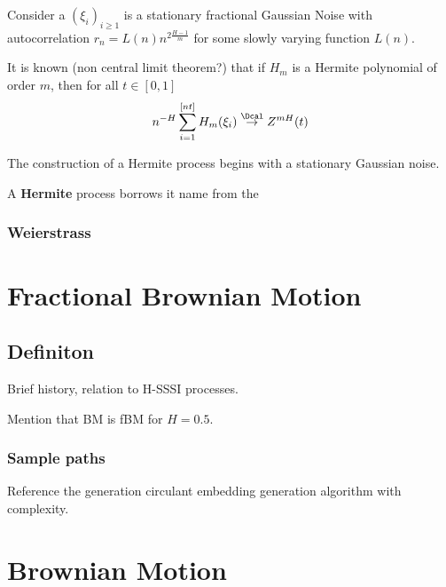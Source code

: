 Consider a $(\xi_i)_{i\geq1}$ is a stationary fractional Gaussian Noise with
autocorrelation $r_n = L(n) n^{2\frac{H-1}{m}}$ for some slowly varying function $L(n)$.

It is known (non central limit theorem?) that if $H_m$ is a Hermite polynomial of
order $m$, then for all $t\in [0,1]$ 
\[ n^{-H} \sum_{i=1}^{[nt]} H_m(\xi_i) \overset{\Dcal}{\rightarrow} Z^{mH}(t) \]

The construction of a Hermite process begins with a stationary Gaussian noise.

A \textbf{Hermite} process borrows it name from the 


\subsubsection{Weierstrass} %
\label{ssub:weierstrass}




\section{Fractional Brownian Motion} %
\label{sec:fractional_brownian_motion}

\subsection{Definiton} %
\label{sub:definiton}
Brief history, relation to H-SSSI processes.

Mention that BM is fBM for $H=0.5$.

\subsubsection{Sample paths} %
\label{ssub:sample_paths}

Reference the generation circulant embedding generation algorithm with complexity.




\section{Brownian Motion} %
\label{sec:brownian_motion}

